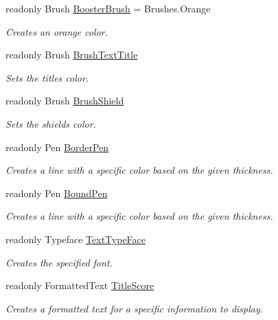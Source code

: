 \begin{DoxyCompactItemize}
readonly Brush \mbox{\hyperlink{class_o_e_invaders_1_1_library_1_1_text_storage_a484aaff1970582992b2dc6c0750688db}{Booster\+Brush}} = Brushes.\+Orange
\begin{DoxyCompactList}\small\item\em Creates an orange color. \end{DoxyCompactList}\item 
readonly Brush \mbox{\hyperlink{class_o_e_invaders_1_1_library_1_1_text_storage_a0a2eaf299c54efa8ec50fa9f3633522c}{Brush\+Text\+Title}}
\begin{DoxyCompactList}\small\item\em Sets the title\textquotesingle{}s color. \end{DoxyCompactList}\item 
readonly Brush \mbox{\hyperlink{class_o_e_invaders_1_1_library_1_1_text_storage_a87baf8b29d067d8c1c17627c762e002e}{Brush\+Shield}}
\begin{DoxyCompactList}\small\item\em Sets the shield\textquotesingle{}s color. \end{DoxyCompactList}\item 
readonly Pen \mbox{\hyperlink{class_o_e_invaders_1_1_library_1_1_text_storage_aa887e0d149f9a24a83af948ad7867b0b}{Border\+Pen}}
\begin{DoxyCompactList}\small\item\em Creates a line with a specific color based on the given thickness. \end{DoxyCompactList}\item 
readonly Pen \mbox{\hyperlink{class_o_e_invaders_1_1_library_1_1_text_storage_a5bff643364c4d838bca817bec092212d}{Bound\+Pen}}
\begin{DoxyCompactList}\small\item\em Creates a line with a specific color based on the given thickness. \end{DoxyCompactList}\item 
readonly Typeface \mbox{\hyperlink{class_o_e_invaders_1_1_library_1_1_text_storage_ac040cbf653db2969fe040f0014be56e4}{Text\+Type\+Face}}
\begin{DoxyCompactList}\small\item\em Creates the specified font. \end{DoxyCompactList}\item 
readonly Formatted\+Text \mbox{\hyperlink{class_o_e_invaders_1_1_library_1_1_text_storage_adbb09c95fa6ffbb409e3dffb5a3b664f}{Title\+Score}}
\begin{DoxyCompactList}\small\item\em Creates a formatted text for a specific information to display. \end{DoxyCompactList}\item 

\end{DoxyCompactItemize}
